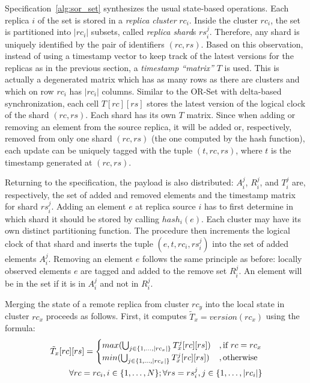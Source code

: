 Specification~\ref{alg:sor_set} synthesizes the usual state-based operations.
Each replica $i$ of the set is stored in a \textit{replica cluster} $rc_{i}$.
Inside the cluster $rc_{i}$, the set is partitioned into $|rc_{i}|$ subsets,
called \textit{replica shard}s $rs_{i}^{j}$. Therefore, any shard is uniquely
identified by the pair of identifiers $(rc, rs)$. Based on this observation,
instead of using a timestamp vector to keep track of the latest versions for the
replicas as in the previous section, a \textit{timestamp ``matrix''} $T$ is
used. This is actually a degenerated matrix which has as many rows as there are
clusters and which on row $rc_{i}$ has $|rc_{i}|$ columns. Similar to the OR-Set
with delta-based synchronization, each cell $T[rc][rs]$ stores the latest
version of the logical clock of the shard $(rc, rs)$. Each shard has its own $T$
matrix. Since when adding or removing an element from the source replica, it
will be added or, respectively, removed from only one shard $(rc, rs)$ (the one
computed by the hash function), each update can be uniquely tagged with the
tuple $(t, rc, rs)$, where $t$ is the timestamp generated at $(rc, rs)$.

Returning to the specification, the payload is also distributed: $A_{i}^{j}$,
$R_{i}^{j}$, and $T_{i}^{j}$ are, respectively, the set of added and removed
elements and the timestamp matrix for shard $rs_{i}^{j}$. Adding an element
$e$ at replica source $i$ has to first determine in which shard it should be
stored by calling $hash_{i}(e)$. Each cluster may have its own distinct
partitioning function. The procedure then increments the logical clock of that
shard and inserts the tuple $(e, t, rc_{i}, rs_{i}^{j})$ into the set of added
elements $A_{i}^{j}$. Removing an element $e$ follows the same principle as
before: locally observed elements $e$ are tagged and added to the remove set
$R_{i}^{j}$. An element will be in the set if it is in $A_{i}^{j}$ and not in
$R_{i}^{j}$.

Merging the state of a remote replica from cluster $rc_{y}$ into the local state
in cluster $rc_{x}$ proceeds as follows. First, it computes $\tilde{T}_{x} =
version(rc_{x})$ using the formula:
\begin{eqnarray*}
\tilde{T}_{x}[rc][rs] = \begin{cases}
                            max (\bigcup_{j \in \{1,\ldots,|rc_{x}|\}} T_{x}^{j}[rc][rs]) &, \text{if } rc = rc_{x} \\
                            min (\bigcup_{j \in \{1,\ldots,|rc_{x}|\}} T_{x}^{j}[rc][rs]) &, \text{otherwise }
                          \end{cases}
\\
\hfill \forall rc = rc_{i}, i \in \{1,\ldots,N\}; \forall rs = rs_{i}^{j}, j \in \{1,\ldots,|rc_{i}|\}
\end{eqnarray*}

